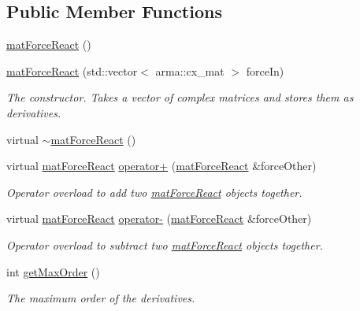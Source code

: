 \subsection*{Public Member Functions}
\begin{DoxyCompactItemize}
\item 
\hyperlink{classosea_1_1ofreq_1_1mat_force_react_a7ab246a401282eb86db5db5036eedc48}{mat\-Force\-React} ()
\item 
\hyperlink{classosea_1_1ofreq_1_1mat_force_react_a2587d123951b9f092bef18b694a59673}{mat\-Force\-React} (std\-::vector$<$ arma\-::cx\-\_\-mat $>$ force\-In)
\begin{DoxyCompactList}\small\item\em The constructor. Takes a vector of complex matrices and stores them as derivatives. \end{DoxyCompactList}\item 
virtual \hyperlink{classosea_1_1ofreq_1_1mat_force_react_a4c70511a7f49650d56b0a2ed42bf4f8b}{$\sim$mat\-Force\-React} ()
\item 
virtual \hyperlink{classosea_1_1ofreq_1_1mat_force_react}{mat\-Force\-React} \hyperlink{classosea_1_1ofreq_1_1mat_force_react_a8f65b2f67fd6169167cc9735370c99eb}{operator+} (\hyperlink{classosea_1_1ofreq_1_1mat_force_react}{mat\-Force\-React} \&force\-Other)
\begin{DoxyCompactList}\small\item\em Operator overload to add two \hyperlink{classosea_1_1ofreq_1_1mat_force_react}{mat\-Force\-React} objects together. \end{DoxyCompactList}\item 
virtual \hyperlink{classosea_1_1ofreq_1_1mat_force_react}{mat\-Force\-React} \hyperlink{classosea_1_1ofreq_1_1mat_force_react_ad3be4d341c5fdabf28634cf102a8fbc9}{operator-\/} (\hyperlink{classosea_1_1ofreq_1_1mat_force_react}{mat\-Force\-React} \&force\-Other)
\begin{DoxyCompactList}\small\item\em Operator overload to subtract two \hyperlink{classosea_1_1ofreq_1_1mat_force_react}{mat\-Force\-React} objects together. \end{DoxyCompactList}\item 
int \hyperlink{classosea_1_1ofreq_1_1mat_force_react_aa163ad7393a29dc15fc2c490f88ef5cd}{get\-Max\-Order} ()
\begin{DoxyCompactList}\small\item\em The maximum order of the derivatives. \end{DoxyCompactList}\item 

\end{DoxyCompactItemize}
